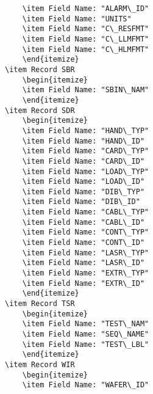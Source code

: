 \documentclass[letterpaper]{article}
\begin{document}
\begin{verbatim}
    \item Field Name: "ALARM\_ID"
    \item Field Name: "UNITS"
    \item Field Name: "C\_RESFMT"
    \item Field Name: "C\_LLMFMT"
    \item Field Name: "C\_HLMFMT"
    \end{itemize}
\item Record SBR
    \begin{itemize}
    \item Field Name: "SBIN\_NAM"
    \end{itemize}
\item Record SDR
    \begin{itemize}
    \item Field Name: "HAND\_TYP"
    \item Field Name: "HAND\_ID"
    \item Field Name: "CARD\_TYP"
    \item Field Name: "CARD\_ID"
    \item Field Name: "LOAD\_TYP"
    \item Field Name: "LOAD\_ID"
    \item Field Name: "DIB\_TYP"
    \item Field Name: "DIB\_ID"
    \item Field Name: "CABL\_TYP"
    \item Field Name: "CABL\_ID"
    \item Field Name: "CONT\_TYP"
    \item Field Name: "CONT\_ID"
    \item Field Name: "LASR\_TYP"
    \item Field Name: "LASR\_ID"
    \item Field Name: "EXTR\_TYP"
    \item Field Name: "EXTR\_ID"
    \end{itemize}
\item Record TSR
    \begin{itemize}
    \item Field Name: "TEST\_NAM"
    \item Field Name: "SEQ\_NAME"
    \item Field Name: "TEST\_LBL"
    \end{itemize}
\item Record WIR
    \begin{itemize}
    \item Field Name: "WAFER\_ID"

\end{verbatim}
\end{document}
